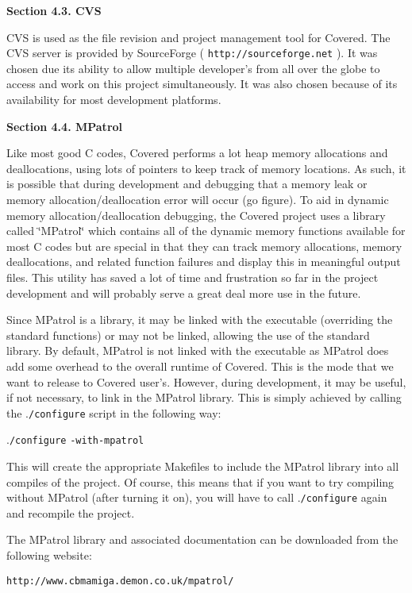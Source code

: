 \begin{Desc}
\item[{\bf Section 4.3.  CVS}]\par
 CVS is used as the file revision and project management tool for Covered. The CVS server is provided by Source\-Forge ( {\tt http://sourceforge.net} ). It was chosen due its ability to allow multiple developer's from all over the globe to access and work on this project simultaneously. It was also chosen because of its availability for most development platforms.

\end{Desc}


\begin{Desc}
\item[{\bf Section 4.4.  MPatrol}]\par
 Like most good C codes, Covered performs a lot heap memory allocations and deallocations, using lots of pointers to keep track of memory locations. As such, it is possible that during development and debugging that a memory leak or memory allocation/deallocation error will occur (go figure). To aid in dynamic memory allocation/deallocation debugging, the Covered project uses a library called \char`\"{}MPatrol\char`\"{} which contains all of the dynamic memory functions available for most C codes but are special in that they can track memory allocations, memory deallocations, and related function failures and display this in meaningful output files. This utility has saved a lot of time and frustration so far in the project development and will probably serve a great deal more use in the future.

 Since MPatrol is a library, it may be linked with the executable (overriding the standard functions) or may not be linked, allowing the use of the standard library. By default, MPatrol is not linked with the executable as MPatrol does add some overhead to the overall runtime of Covered. This is the mode that we want to release to Covered user's. However, during development, it may be useful, if not necessary, to link in the MPatrol library. This is simply achieved by calling the .{\tt /configure} script in the following way:

 .{\tt /configure} {\tt -with-mpatrol}

 This will create the appropriate Makefiles to include the MPatrol library into all compiles of the project. Of course, this means that if you want to try compiling without MPatrol (after turning it on), you will have to call .{\tt /configure} again and recompile the project.

 The MPatrol library and associated documentation can be downloaded from the following website:

 {\tt http://www.cbmamiga.demon.co.uk/mpatrol/}

\end{Desc}


